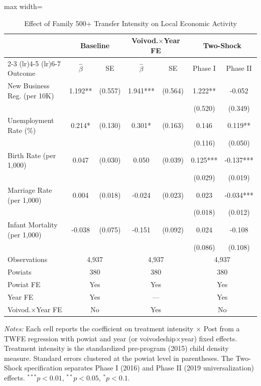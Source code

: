 \begin{table}[htbp]
\centering
\caption{Effect of Family 500+ Transfer Intensity on Local Economic Activity}
\label{tab:main}
\begin{threeparttable}
\begin{adjustbox}{max width=\textwidth}
\footnotesize
\begin{tabular}{lcccccc}
\toprule
 & \multicolumn{2}{c}{Baseline} & \multicolumn{2}{c}{Voivod.$\times$Year FE} & \multicolumn{2}{c}{Two-Shock} \\
\cmidrule(lr){2-3} \cmidrule(lr){4-5} \cmidrule(lr){6-7}
Outcome & $\hat{\beta}$ & SE & $\hat{\beta}$ & SE & Phase I & Phase II \\
\midrule
New Business Reg. (per 10K) & 1.192** & (0.557) & 1.941*** & (0.564) & 1.222** & -0.052 \\
 & & & & & (0.520) & (0.349) \\
Unemployment Rate (\%) & 0.214* & (0.130) & 0.301* & (0.163) & 0.146 & 0.119** \\
 & & & & & (0.116) & (0.050) \\
Birth Rate (per 1,000) & 0.047 & (0.030) & 0.050 & (0.039) & 0.125*** & -0.137*** \\
 & & & & & (0.029) & (0.019) \\
Marriage Rate (per 1,000) & 0.004 & (0.018) & -0.024 & (0.023) & 0.023 & -0.034*** \\
 & & & & & (0.018) & (0.012) \\
Infant Mortality (per 1,000) & -0.038 & (0.075) & -0.151 & (0.092) & 0.024 & -0.108 \\
 & & & & & (0.086) & (0.108) \\
\midrule
Observations & \multicolumn{2}{c}{4,937} & \multicolumn{2}{c}{4,937} & \multicolumn{2}{c}{4,937} \\
Powiats & \multicolumn{2}{c}{380} & \multicolumn{2}{c}{380} & \multicolumn{2}{c}{380} \\
Powiat FE & \multicolumn{2}{c}{Yes} & \multicolumn{2}{c}{Yes} & \multicolumn{2}{c}{Yes} \\
Year FE & \multicolumn{2}{c}{Yes} & \multicolumn{2}{c}{---} & \multicolumn{2}{c}{Yes} \\
Voivod.$\times$Year FE & \multicolumn{2}{c}{No} & \multicolumn{2}{c}{Yes} & \multicolumn{2}{c}{No} \\
\bottomrule
\end{tabular}
\end{adjustbox}
\begin{tablenotes}[flushleft]\small
\item \textit{Notes:} Each cell reports the coefficient on treatment intensity $\times$ Post from a TWFE regression with powiat and year (or voivodeship$\times$year) fixed effects. Treatment intensity is the standardized pre-program (2015) child density measure. Standard errors clustered at the powiat level in parentheses. The Two-Shock specification separates Phase I (2016) and Phase II (2019 universalization) effects. $^{***}p<0.01$, $^{**}p<0.05$, $^{*}p<0.1$.
\end{tablenotes}
\end{threeparttable}
\end{table}
